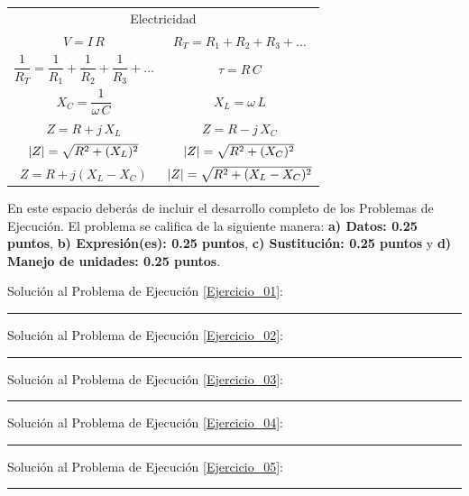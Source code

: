 \documentclass[12pt, letter]{exam}
\begin{document}
\begin{table}[H]
    \centering
    \setlength{\tabcolsep}{40pt}
    \renewcommand{\arraystretch}{2.5}
    \begin{tabular}{c  c}
        \multicolumn{2}{c}{Electricidad} \\
        $V = I \, R$ & $R_{T} = R_{1} + R_{2} + R_{3} + \ldots$ \\
        $\dfrac{1}{R_{T}} = \dfrac{1}{R_{1}} + \dfrac{1}{R_{2}} + \dfrac{1}{R_{3}} + \ldots$ & $\tau = R \, C$ \\
        $X_{C} = \dfrac{1}{\omega \, C}$ & $X_{L} = \omega\, L$ \\
        $Z = R + j \, X_{L}$ & $Z = R - j \, X_{C}$ \\
        $\abs{Z} = \sqrt{R^{2} + (X_{L})^{2}}$ & $\abs{Z} = \sqrt{R^{2} + (X_{C})^{2}}$ \\
        $Z = R + j (X_{L} - X_{C})$ & $\abs{Z} = \sqrt{R^{2} + (X_{L} - X_{C})^{2}}$
\end{tabular}
\end{table}

\newpage

En este espacio deberás de incluir el desarrollo completo de los Problemas de Ejecución. El problema se califica de la siguiente manera: \textbf{a) Datos: 0.25 puntos}, \textbf{b) Expresión(es): 0.25 puntos}, \textbf{c) Sustitución: 0.25 puntos} y \textbf{d) Manejo de unidades: 0.25 puntos}.

\vspace*{0.5cm}
Solución al Problema de Ejecución \ref{Ejercicio_01}:

\vspace*{4cm}
\rule{0.9\textwidth}{0.1mm}

Solución al Problema de Ejecución \ref{Ejercicio_02}:

\vspace*{4.5cm}
\rule{0.9\textwidth}{0.1mm}

Solución al Problema de Ejecución \ref{Ejercicio_03}:

\vspace*{4.5cm}
\rule{0.9\textwidth}{0.1mm}

Solución al Problema de Ejecución \ref{Ejercicio_04}:

\vspace*{4.5cm}
\rule{0.9\textwidth}{0.1mm}

Solución al Problema de Ejecución \ref{Ejercicio_05}:

\vspace*{4.5cm}
\rule{0.9\textwidth}{0.1mm}
\end{document}
